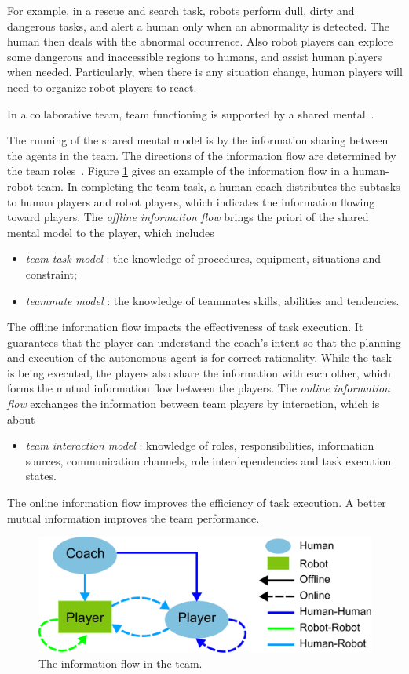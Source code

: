 \documentclass[phd]{byuprop}
\begin{document}
For example, in a rescue and search task, robots perform dull, dirty and dangerous tasks, and alert a human only when an abnormality is detected.
The human then deals with the abnormal occurrence.
Also robot players can explore some dangerous and inaccessible regions to humans, and assist human players when needed.
Particularly, when there is any situation change, human players will need to organize robot players to react.

In a collaborative team, team functioning is supported by a shared mental~\cite{Jonker:2010:SMM:2018118.2018128}.

The running of the shared mental model is by the information sharing between the agents in the team.
The directions of the information flow are determined by the team roles~\cite{Yen_implementingshared}.
Figure \ref{fig:team_info_flow} gives an example of the information flow in a human-robot team.
In completing the team task, a human coach distributes the subtasks to human players and robot players, which indicates the information flowing toward players.
The {\em offline information flow} brings the priori of the shared mental model to the player, which includes~\cite{Goodrich2013}
\begin{itemize}
\item {\em team task model} : the knowledge of procedures, equipment, situations and constraint; 
\item {\em teammate model} : the knowledge of teammates skills, abilities and tendencies.
\end{itemize}
The offline information flow impacts the effectiveness of task execution.
It guarantees that the player can understand the coach's intent so that the planning and execution of the autonomous agent is for correct rationality.
While the task is being executed, the players also share the information with each other, which forms the mutual information flow between the players.
The {\em online information flow} exchanges the information between team players by interaction, which is about
\begin{itemize} 
\item {\em team interaction model} : knowledge of roles, responsibilities, information sources, communication channels, role interdependencies and task execution states.
\end{itemize}
The online information flow improves the efficiency of task execution.
A better mutual information improves the team performance.

\begin{figure}[hbtp]
\centering
\includegraphics[width=0.6\linewidth]{./fig/team_info_flow.pdf}
\caption{The information flow in the team.}
\label{fig:team_info_flow}
\end{figure}
\end{document}
